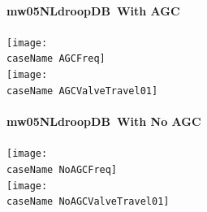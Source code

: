 \documentclass[12pt]{article}
\newcommand{\caseName}{ }
\begin{document}
\renewcommand{\caseName}{mw05NLdroopDB}
\paragraph{\caseName\ With AGC} 
\begin{center}
	\texttt{[image: \\caseName AGCFreq]}\\
	\texttt{[image: \\caseName AGCValveTravel01]} \\
\end{center}
\paragraph{\caseName\ With No AGC} 
\begin{center}
	\texttt{[image: \\caseName NoAGCFreq]} \\
	\texttt{[image: \\caseName NoAGCValveTravel01]} 
\end{center}
\pagebreak



\end{document}
